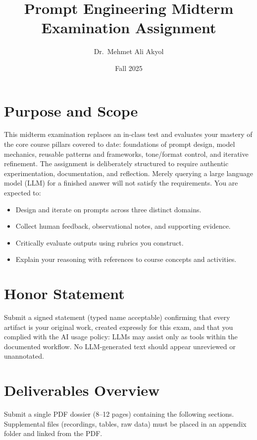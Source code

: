 \documentclass[11pt]{article}
\title{Prompt Engineering Midterm Examination Assignment}
\author{Dr.~Mehmet Ali Akyol}
\date{Fall 2025}
\begin{document}
\maketitle

\section*{Purpose and Scope}
This midterm examination replaces an in-class test and evaluates your mastery of the core course pillars covered to date: foundations of prompt design, model mechanics, reusable patterns and frameworks, tone/format control, and iterative refinement. The assignment is deliberately structured to require authentic experimentation, documentation, and reflection. Merely querying a large language model (LLM) for a finished answer will not satisfy the requirements. You are expected to:
\begin{itemize}
    \item Design and iterate on prompts across three distinct domains.
    \item Collect human feedback, observational notes, and supporting evidence.
    \item Critically evaluate outputs using rubrics you construct.
    \item Explain your reasoning with references to course concepts and activities.
\end{itemize}

\section*{Honor Statement}
Submit a signed statement (typed name acceptable) confirming that every artifact is your original work, created expressly for this exam, and that you complied with the AI usage policy: LLMs may assist only as tools within the documented workflow. No LLM-generated text should appear unreviewed or unannotated.

\section{Deliverables Overview}
Submit a single PDF dossier (8--12 pages) containing the following sections. Supplemental files (recordings, tables, raw data) must be placed in an appendix folder and linked from the PDF.
\end{document}
